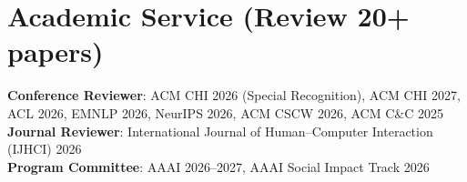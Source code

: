 \section{Academic Service (Review 20+ papers)}
\begin{itemize}[leftmargin=0.15in, label={}]
    \small{\item{
        \textbf{Conference Reviewer}: 
        ACM CHI 2026 (Special Recognition),
        ACM CHI 2027,
        ACL 2026,
        EMNLP 2026,
        NeurIPS 2026,
        ACM CSCW 2026,
        ACM C\&C 2025 \\
        \textbf{Journal Reviewer}: International Journal of Human--Computer Interaction (IJHCI) 2026 \\
        \textbf{Program Committee}: AAAI 2026--2027, AAAI Social Impact Track 2026
    }}
\end{itemize}
